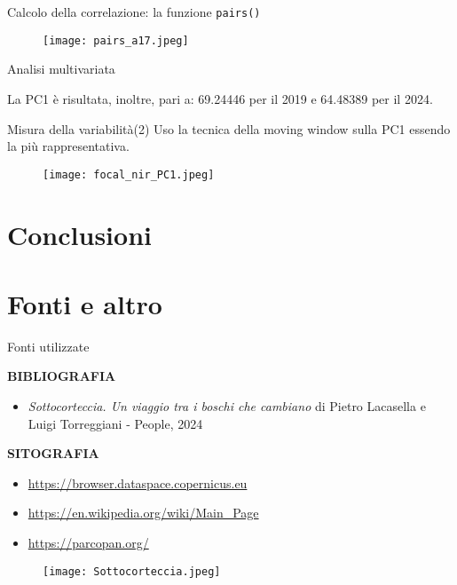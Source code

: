 \documentclass{beamer} %
\begin{document}
\begin{frame}{Calcolo della correlazione: la funzione \texttt{pairs()} }
    
    \begin{figure}
        \centering
        \texttt{[image: pairs\_a17.jpeg]}
    \end{figure}
\end{frame}

\begin{frame}{Analisi multivariata}
    
    \bigskip
    La PC1 è risultata, inoltre, pari a: 69.24446 per il 2019 e 64.48389 per il 2024.
    \end{frame}

\begin{frame}{Misura della variabilità(2)}
    Uso la tecnica della moving window sulla PC1 essendo la più rappresentativa.
    \begin{figure}
        \centering
        \texttt{[image: focal\_nir\_PC1.jpeg]}
    \end{figure}
\end{frame}

\section{Conclusioni}

\section{Fonti e altro}

 \begin{frame}{Fonti utilizzate}
 \begin{multicols}{2}
 \textbf{BIBLIOGRAFIA}
 \begin{itemize}
     \item \textit{Sottocorteccia. Un viaggio tra i boschi che cambiano} di 
Pietro Lacasella e Luigi Torreggiani - People, 2024
 \end{itemize}
\bigskip
 \textbf{SITOGRAFIA}
            \begin{itemize}
                \item \url{https://browser.dataspace.copernicus.eu} \\
                \item \url{https://en.wikipedia.org/wiki/Main_Page} \\
                \item \url{https://parcopan.org/} \\
            \end{itemize}  
\columnbreak
\begin{figure}
    \centering
    \texttt{[image: Sottocorteccia.jpeg]}
\end{figure}
\end{multicols}
        \end{frame}
        
\end{document}
